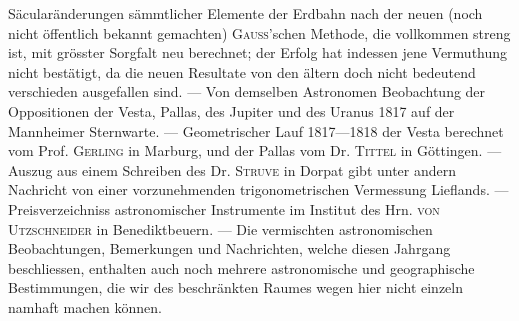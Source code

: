 Säcularänderungen sämmtlicher Elemente der Erdbahn nach der neuen (noch nicht öffentlich bekannt gemachten) \textsc{Gauss}'schen Methode, die vollkommen streng ist, mit grösster Sorgfalt neu berechnet; der Erfolg hat indessen jene Vermuthung nicht bestätigt, da die neuen Resultate von den ältern doch nicht bedeutend verschieden ausgefallen sind. --- Von demselben Astronomen Beobachtung der Oppositionen der Vesta, Pallas, des Jupiter und des Uranus 1817 auf der Mannheimer Sternwarte. --- Geometrischer Lauf 1817---1818 der Vesta berechnet vom Prof. \textsc{Gerling} in Marburg, und der Pallas vom Dr. \textsc{Tittel} in Göttingen. --- Auszug aus einem Schreiben des Dr. \textsc{Struve} in Dorpat gibt unter andern Nachricht von einer vorzunehmenden trigonometrischen Vermessung Lieflands. --- Preisverzeichniss astronomischer Instrumente im Institut des Hrn. \textsc{von Utzschneider} in Benediktbeuern. --- Die vermischten astronomischen Beobachtungen, Bemerkungen und Nachrichten, welche diesen Jahrgang beschliessen, enthalten auch noch mehrere astronomische und geographische Bestimmungen, die wir des beschränkten Raumes wegen hier nicht einzeln namhaft machen können.

\clearpage
\endgroup
